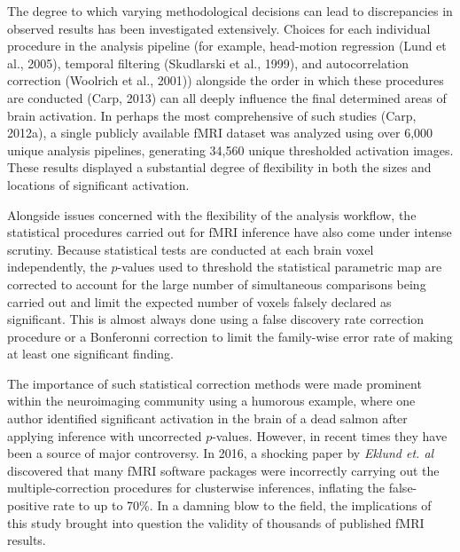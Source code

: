 The degree to which varying methodological decisions can lead to discrepancies in observed results has been investigated extensively. Choices for each individual procedure in the analysis pipeline (for example, head-motion regression (Lund et al., 2005), temporal filtering (Skudlarski et al., 1999), and autocorrelation correction (Woolrich et al., 2001)) alongside the order in which these procedures are conducted (Carp, 2013) can all deeply influence the final determined areas of brain activation. In perhaps the most comprehensive of such studies (Carp, 2012a), a single publicly available fMRI dataset was analyzed using over 6,000 unique analysis pipelines, generating 34,560 unique thresholded activation images. These results displayed a substantial degree of flexibility in both the sizes and locations of significant activation.

Alongside issues concerned with the flexibility of the analysis workflow, the statistical procedures carried out for fMRI inference have also come under intense scrutiny. Because statistical tests are conducted at each brain voxel independently, the $p$-values used to threshold the statistical parametric map are corrected to account for the large number of simultaneous comparisons being carried out and limit the expected number of voxels falsely declared as significant. This is almost always done using a false discovery rate correction procedure or a Bonferonni correction to limit the family-wise error rate of making at least one significant finding. 

The importance of such statistical correction methods were made prominent within the neuroimaging community using a humorous example, where one author identified significant activation in the brain of a dead salmon after applying inference with uncorrected $p$-values. However, in recent times they have been a source of major controversy. In 2016, a shocking paper by \textit{Eklund et. al} discovered that many fMRI software packages were incorrectly carrying out the multiple-correction procedures for clusterwise inferences, inflating the false-positive rate to up to 70\%. In a damning blow to the field, the implications of this study brought into question the validity of thousands of published fMRI results. 

